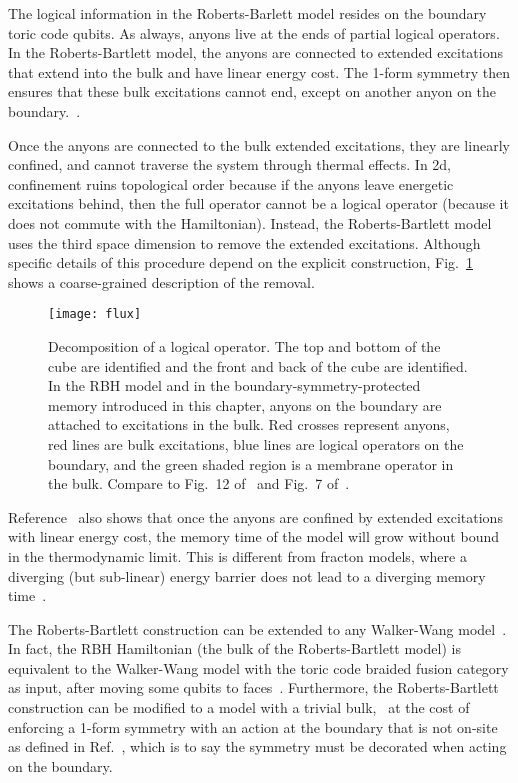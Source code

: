 The logical information in the Roberts-Barlett model resides on the boundary toric code qubits. As always, anyons live at the ends of partial logical operators.  In the Roberts-Bartlett model, the anyons are connected to extended excitations that extend into the bulk and have linear energy cost. The 1-form symmetry then ensures that these bulk excitations cannot end, except on another anyon on the boundary.~\cite{RobertsBartlett2020}.

Once the anyons are connected to the bulk extended excitations, they are linearly confined, and cannot traverse the system through thermal effects. In 2d, confinement ruins topological order because if the anyons leave energetic excitations behind, then the full operator cannot be a logical operator (because it does not commute with the Hamiltonian). Instead, the Roberts-Bartlett model uses the third space dimension to remove the extended excitations. Although specific details of this procedure depend on the explicit construction, Fig.~\ref{fig:flux} shows a coarse-grained description of the removal.

\begin{figure}[th!]
    \centering
    \texttt{[image: flux]}
    \caption[Decomposition of a logical operator]{Decomposition of a logical operator. The top and bottom of the cube are identified and the front and back of the cube are identified. In the RBH model and in the boundary-symmetry-protected memory introduced in this chapter, anyons on the boundary are attached to excitations in the bulk. Red crosses represent anyons, red lines are bulk excitations, blue lines are logical operators on the boundary, and the green shaded region is a membrane operator in the bulk. Compare to Fig.~12 of~\cite{RobertsBartlett2020} and Fig.~7 of~\cite{StahlNandkishore2021}.}
    \label{fig:flux}
\end{figure}

Reference~\cite{RobertsBartlett2020} also shows that once the anyons are confined by extended excitations with linear energy cost, the memory time of the model will grow without bound in the thermodynamic limit. This is different from fracton models, where a diverging (but sub-linear) energy barrier does not lead to a diverging memory time~\cite{Siva2017Marginally}.

The Roberts-Bartlett construction can be extended to any Walker-Wang model~\cite{WalkerWang2011, vonKeyserlingk2013SurfaceAnyons}. In fact, the RBH Hamiltonian (the bulk of the Roberts-Bartlett model) is equivalent to the Walker-Wang model with the toric code braided fusion category as input, after moving some qubits to faces~\cite{Roberts20203Fermion}. Furthermore, the Roberts-Bartlett construction can be modified to a model with a trivial bulk,~\cite{StahlNandkishore2021} at the cost of enforcing a 1-form symmetry with an action at the boundary that is not on-site as defined in Ref.~\cite{Wen2019Higher}, which is to say the symmetry must be decorated when acting on the boundary.


